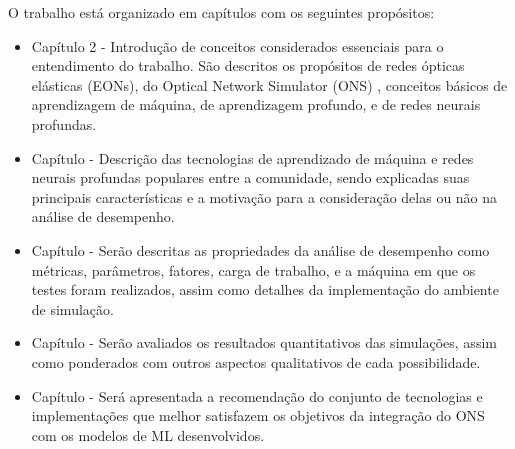 O trabalho está organizado em \todo[?] capítulos com os seguintes propósitos:

\begin{itemize}
  \item Capítulo 2 - Introdução de conceitos considerados essenciais para o entendimento do trabalho. São descritos os propósitos de redes ópticas elásticas (EONs), do Optical Network Simulator (ONS) \cite{costa2016ons}, conceitos básicos de aprendizagem de máquina, de aprendizagem profundo, e de redes neurais profundas.

  \item Capítulo \todo[?] - Descrição das tecnologias de aprendizado de máquina e redes neurais profundas populares entre a comunidade, sendo explicadas suas principais características e a motivação para a consideração delas ou não na análise de desempenho.

  \item Capítulo \todo[análise] - Serão descritas as propriedades da análise de desempenho como métricas, parâmetros, fatores, carga de trabalho, e a máquina em que os testes foram realizados, assim como detalhes da implementação do ambiente de simulação.

  \item Capítulo \todo[resultados] - Serão avaliados os resultados quantitativos das simulações, assim como ponderados com outros aspectos qualitativos de cada possibilidade.

  \item Capítulo \todo[conclusão] - Será apresentada a recomendação do conjunto de tecnologias e implementações que melhor satisfazem os objetivos da integração do ONS com os modelos de ML desenvolvidos.
\end{itemize}







